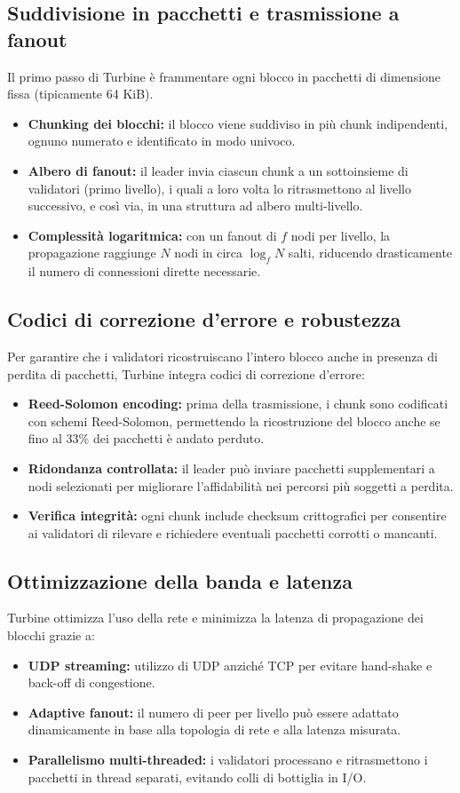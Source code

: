 \documentclass[a4paper,12pt]{report}
\begin{document}
	\subsection{Suddivisione in pacchetti e trasmissione a fanout}
	Il primo passo di Turbine è frammentare ogni blocco in pacchetti di dimensione fissa (tipicamente 64 KiB).  
	\begin{itemize}
		\item \textbf{Chunking dei blocchi:} il blocco viene suddiviso in più chunk indipendenti, ognuno numerato e identificato in modo univoco.
		\item \textbf{Albero di fanout:} il leader invia ciascun chunk a un sottoinsieme di validatori (primo livello), i quali a loro volta lo ritrasmettono al livello successivo, e così via, in una struttura ad albero multi-livello.
		\item \textbf{Complessità logaritmica:} con un fanout di \(f\) nodi per livello, la propagazione raggiunge \(N\) nodi in circa \(\log_f N\) salti, riducendo drasticamente il numero di connessioni dirette necessarie.
	\end{itemize}
	
	\subsection{Codici di correzione d’errore e robustezza}
	Per garantire che i validatori ricostruiscano l’intero blocco anche in presenza di perdita di pacchetti, Turbine integra codici di correzione d’errore:
	\begin{itemize}
		\item \textbf{Reed-Solomon encoding:} prima della trasmissione, i chunk sono codificati con schemi Reed-Solomon, permettendo la ricostruzione del blocco anche se fino al 33\% dei pacchetti è andato perduto.
		\item \textbf{Ridondanza controllata:} il leader può inviare pacchetti supplementari a nodi selezionati per migliorare l’affidabilità nei percorsi più soggetti a perdita.
		\item \textbf{Verifica integrità:} ogni chunk include checksum crittografici per consentire ai validatori di rilevare e richiedere eventuali pacchetti corrotti o mancanti.
	\end{itemize}
	
	\subsection{Ottimizzazione della banda e latenza}
	Turbine ottimizza l’uso della rete e minimizza la latenza di propagazione dei blocchi grazie a:  
	\begin{itemize}
		\item \textbf{UDP streaming:} utilizzo di UDP anziché TCP per evitare hand-shake e back-off di congestione.
		\item \textbf{Adaptive fanout:} il numero di peer per livello può essere adattato dinamicamente in base alla topologia di rete e alla latenza misurata.
		\item \textbf{Parallelismo multi-threaded:} i validatori processano e ritrasmettono i pacchetti in thread separati, evitando colli di bottiglia in I/O.
	\end{itemize}
	
\end{document}
